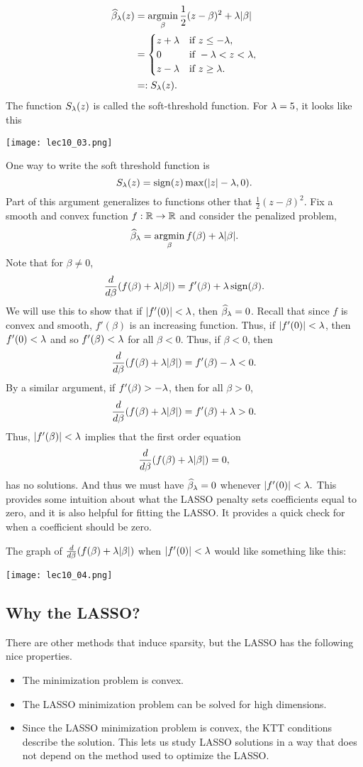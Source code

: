 \begin{align*}
    \widehat{\beta}_\lambda(z) &= \operatorname*{argmin}_\beta \frac{1}{2}(z-\beta)^2+\lambda{\left\lvert\beta\right\rvert} \\
    &=\begin{cases}
        z+\lambda & \text{if } z \le - \lambda,\\
        0 & \text{if } -\lambda < z < \lambda,\\
        z-\lambda & \text{if } z \ge \lambda.
    \end{cases}\\
    &=:S_\lambda(z).
\end{align*}
The function $S_\lambda(z)$ is called the soft-threshold function. For $\lambda = 5$, it looks like this
\begin{center}
    \texttt{[image: lec10\_03.png]}
\end{center}
One way to write the soft threshold function is  
\[S_\lambda(z) = \operatorname{sign}(z)\max({\left\lvert z\right\rvert}-\lambda,0). \]
Part of this argument generalizes to functions other that $\frac{1}{2}(z-\beta)^2$. Fix a smooth and convex function $f: {\mathbb R} \to {\mathbb R}$ and consider the penalized problem,
\[\widehat{\beta}_\lambda = \operatorname*{argmin}_\beta f(\beta) + \lambda {\left\lvert\beta\right\rvert}.  \]
Note that for $\beta \neq 0$,
\[\frac{d}{d\beta} (f(\beta)+\lambda {\left\lvert\beta\right\rvert}) = f'(\beta)+\lambda \operatorname{sign}(\beta). \]
We will use this to show that if ${\left\lvert f'(0)\right\rvert} < \lambda$, then $\widehat{\beta}_\lambda = 0$. Recall that since $f$ is convex and smooth, $f'(\beta)$ is an increasing function. Thus, if ${\left\lvert f'(0)\right\rvert} < \lambda$, then $f'(0) < \lambda$ and so $f'(\beta)< \lambda$ for all $\beta < 0$. Thus, if $\beta < 0$, then 
\[\frac{d}{d\beta} (f(\beta)+\lambda {\left\lvert\beta\right\rvert}) = f'(\beta)-\lambda < 0. \]
By a similar argument, if $f'(\beta) > - \lambda$, then for all $\beta > 0$,
\[\frac{d}{d\beta}( f(\beta)+\lambda {\left\lvert\beta\right\rvert}) = f'(\beta)+\lambda > 0. \]
Thus, ${\left\lvert f'(\beta)\right\rvert} < \lambda$ implies that the first order equation
\[\frac{d}{d\beta}( f(\beta)+\lambda {\left\lvert\beta\right\rvert} )= 0, \]
has no solutions. And thus we must have $\widehat{\beta}_\lambda = 0$ whenever ${\left\lvert f'(0)\right\rvert}<\lambda.$ This provides some intuition about what the LASSO penalty sets coefficients equal to zero, and it is also helpful for fitting the LASSO. It provides a quick check for when a coefficient should be zero. 

The graph of $\frac{d}{d\beta} (f(\beta)+\lambda{\left\lvert\beta\right\rvert})$ when ${\left\lvert f'(0)\right\rvert} < \lambda$ would like something like this:
\begin{center}
    \texttt{[image: lec10\_04.png]}
\end{center}
\subsection{Why the LASSO?}
There are other methods that induce sparsity, but the LASSO has the following nice properties.
\begin{itemize}
    \item The minimization problem is convex.
    \item The LASSO minimization problem can be solved for high dimensions.
    \item Since the LASSO minimization problem is convex, the KTT conditions describe the solution. This lets us study LASSO solutions in a way that does not depend on the method used to optimize the LASSO.
\end{itemize}
